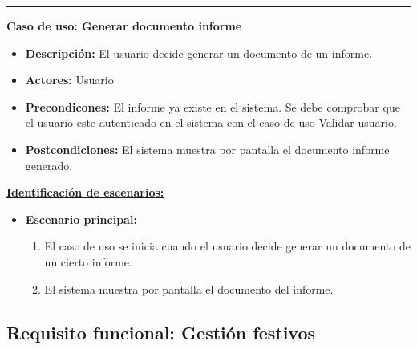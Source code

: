 \smallskip
\hrule height 1pt
\smallskip
\textbf{Caso de uso: Generar documento informe}
\begin{itemize}\renewcommand{\labelitemi}{$\cdot$}
 \item \textbf{Descripción:} El usuario decide generar un documento de un informe.
  \item \textbf{Actores:} Usuario
  \item \textbf{Precondicones:} El informe ya existe en el sistema. Se debe comprobar que el usuario este autenticado en el sistema con el caso de uso Validar usuario.
  \item \textbf{Postcondiciones:} El sistema muestra por pantalla el documento informe generado.
\end{itemize}
\underline{\textbf{Identificación de escenarios:}}
\begin{itemize}\renewcommand{\labelitemi}{$\circ$}
 \item \textbf{Escenario principal:}
         \begin{enumerate}
          \item El caso de uso se inicia cuando el usuario decide generar un documento de un cierto informe.
	  \item El sistema muestra por pantalla el documento del informe.
         \end{enumerate}
\end{itemize}

\subsection{Requisito funcional: Gestión festivos}

